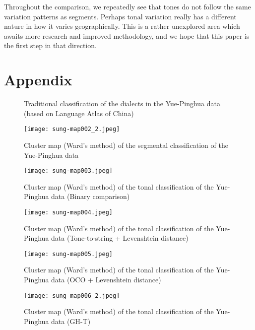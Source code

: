\documentclass[output=paper, chinesefont]{langscibook}
\begin{document}
Throughout the comparison, we repeatedly see that tones do not follow the same variation patterns as segments. Perhaps tonal variation really has a different nature in how it varies geographically. This is a rather unexplored area which awaits more research and improved methodology, and we hope that this paper is the first step in that direction.


\section*{Appendix}
\label{sec:sung:appendix}

\begin{figure}[H]
\caption{\label{map:sung:1} Traditional classification of the dialects in the Yue-Pinghua data (based on Language Atlas of China)}
\end{figure}



\begin{sidewaysfigure}[H]
\texttt{[image: sung-map002\_2.jpeg]}
\caption{\label{map:sung:2} Cluster map (Ward’s method) of the segmental classification of the Yue-Pinghua data}
\end{sidewaysfigure}

 

\begin{sidewaysfigure}[H]
\texttt{[image: sung-map003.jpeg]}
\caption{\label{map:sung:3bin} Cluster map (Ward’s method) of the tonal classification of the Yue-Pinghua data (Binary comparison)}
\end{sidewaysfigure}


\begin{sidewaysfigure}[H]
\texttt{[image: sung-map004.jpeg]}
\caption{\label{map:sung:3lev}Cluster map (Ward’s method) of the tonal classification of the Yue-Pinghua data (Tone-to-string + Levenshtein distance)}
\end{sidewaysfigure}


\begin{sidewaysfigure}[H]
\texttt{[image: sung-map005.jpeg]}
\caption{\label{map:sung:5} Cluster map (Ward’s method) of the tonal classification of the Yue-Pinghua data (OCO + Levenshtein distance)}
\end{sidewaysfigure}


\begin{sidewaysfigure}[H]
\texttt{[image: sung-map006\_2.jpeg]}
\caption{\label{map:sung:6} Cluster map (Ward’s method) of the tonal classification of the Yue-Pinghua data (GH-T)}
\end{sidewaysfigure}


\printbibliography[heading=subbibliography,notkeyword=this]
\end{document}
